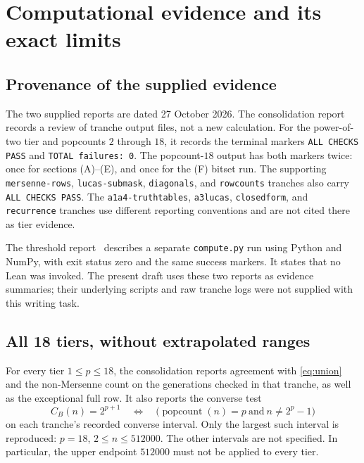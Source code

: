 \documentclass[11pt]{article}
\newcommand{\pc}{\operatorname{popcount}}
\begin{document}
\section{Computational evidence and its exact limits}
\label{sec:evidence}

\subsection{Provenance of the supplied evidence}

The two supplied reports are dated 27 October 2026. The consolidation
report~\cite{report-consolidation} records a review of tranche output files,
not a new calculation. For the power-of-two tier and popcounts $2$ through
$18$, it records the terminal markers \texttt{ALL CHECKS PASS} and
\texttt{TOTAL failures: 0}. The popcount-$18$ output has both markers twice:
once for sections (A)--(E), and once for the (F) bitset run. The supporting
\texttt{mersenne-rows}, \texttt{lucas-submask}, \texttt{diagonals}, and
\texttt{rowcounts} tranches also carry \texttt{ALL CHECKS PASS}. The
\texttt{a1a4-truthtables}, \texttt{a3lucas}, \texttt{closedform}, and
\texttt{recurrence} tranches use different reporting conventions and are
not cited there as tier evidence.

The threshold report~\cite{report-threshold} describes a separate
\texttt{compute.py} run using Python and NumPy, with exit status zero and
the same success markers. It states that no Lean was invoked. The present
draft uses these two reports as evidence summaries; their underlying
scripts and raw tranche logs were not supplied with this writing task.

\subsection{All 18 tiers, without extrapolated ranges}

For every tier $1\leq p\leq18$, the consolidation reports agreement with
\eqref{eq:union} and the non-Mersenne count on the generations checked in
that tranche, as well as the exceptional full row. It also reports the
converse test
\begin{equation}
 C_B(n)=2^{p+1}
 \quad\Longleftrightarrow\quad
 \bigl(\pc(n)=p\ \text{and}\ n\ne2^p-1\bigr)
 \label{eq:converse}
\end{equation}
on each tranche's recorded converse interval. Only the largest such
interval is reproduced: $p=18$, $2\leq n\leq512000$. The other intervals
are not specified. In particular, the upper endpoint $512000$ must not be
applied to every tier.
\end{document}
